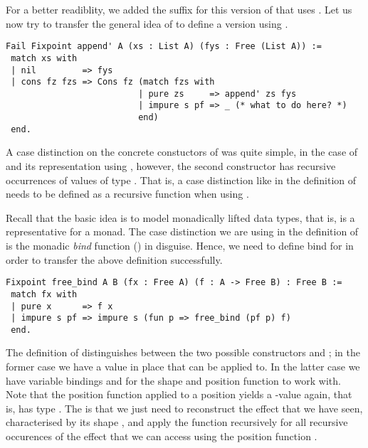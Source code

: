 For a better readiblity, we added the suffix  for this version of  that uses .
Let us now try to transfer the general idea of  to define a version using .

\begin{verbatim}
Fail Fixpoint append' A (xs : List A) (fys : Free (List A)) :=
 match xs with
 | nil         => fys
 | cons fz fzs => Cons fz (match fzs with
                          | pure zs     => append' zs fys
                          | impure s pf => _ (* what to do here? *)
                          end)
 end.
\end{verbatim}

A case distinction on the concrete constuctors of  was quite simple, in the case of  and its representation using , however, the second constructor  has recursive occurrences of values of type .
That is, a case distinction like in the definition of  needs to be defined as a recursive function when using .

Recall that the basic idea is to model monadically lifted data types, that is,  is a representative for a monad.
The case distinction we are using in the definition of  is the monadic \emph{bind} function (\cinl{(>>=)}) in disguise.
Hence, we need to define bind for  in order to transfer the above definition successfully.

\begin{verbatim}
Fixpoint free_bind A B (fx : Free A) (f : A -> Free B) : Free B :=
 match fx with
 | pure x      => f x
 | impure s pf => impure s (fun p => free_bind (pf p) f)
 end.
\end{verbatim}

The definition of  distinguishes between the two possible constructors  and ; in the former case we have a value  in place that  can be applied to.
In the latter case we have variable bindings  and  for the shape and position function to work with.
Note that the position function applied to a position yields a -value again, that is,  has type
.
The is that we just need to reconstruct the effect that we have seen, characterised by its shape , and apply the function  recursively for all recursive occurences of the effect that we can access using the position function .

